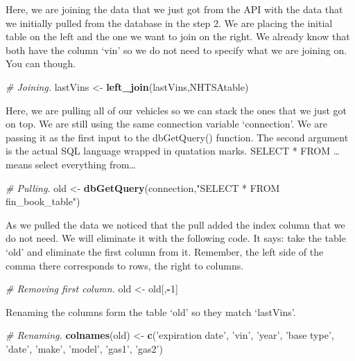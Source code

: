 \documentclass[]{book}
\newenvironment{Shaded}{\begin{snugshade}}{\end{snugshade}}
\newcommand{\CommentTok}[1]{\textcolor[rgb]{0.56,0.35,0.01}{\textit{#1}}}
\newcommand{\DecValTok}[1]{\textcolor[rgb]{0.00,0.00,0.81}{#1}}
\newcommand{\KeywordTok}[1]{\textcolor[rgb]{0.13,0.29,0.53}{\textbf{#1}}}
\newcommand{\NormalTok}[1]{#1}
\newcommand{\OperatorTok}[1]{\textcolor[rgb]{0.81,0.36,0.00}{\textbf{#1}}}
\newcommand{\StringTok}[1]{\textcolor[rgb]{0.31,0.60,0.02}{#1}}
\begin{document}
Here, we are joining the data that we just got from the API with the data that we initially pulled from the database in the step 2. We are placing the initial table on the left and the one we want to join on the right. We already know that both have the column `vin' so we do not need to specify what we are joining on. You can though.

\begin{Shaded}
\begin{Highlighting}[]
\CommentTok{# Joining.}
\NormalTok{lastVins <-}\StringTok{ }\KeywordTok{left_join}\NormalTok{(lastVins,NHTSAtable)}
\end{Highlighting}
\end{Shaded}

Here, we are pulling all of our vehicles so we can stack the ones that we just got on top. We are still using the same connection variable `connection'. We are passing it as the first input to the dbGetQuery() function. The second argument is the actual SQL language wrapped in quatation marks. SELECT * FROM \ldots{} means select everything from\ldots{}

\begin{Shaded}
\begin{Highlighting}[]
\CommentTok{# Pulling.}
\NormalTok{old <-}\StringTok{ }\KeywordTok{dbGetQuery}\NormalTok{(connection,}\StringTok{"SELECT * FROM fin_book_table"}\NormalTok{)}
\end{Highlighting}
\end{Shaded}

As we pulled the data we noticed that the pull added the index column that we do not need. We will eliminate it with the following code. It says: take the table `old' and eliminate the first column from it. Remember, the left side of the comma there corresponds to rows, the right to columns.

\begin{Shaded}
\begin{Highlighting}[]
\CommentTok{# Removing first column.}
\NormalTok{old <-}\StringTok{ }\NormalTok{old[,}\OperatorTok{-}\DecValTok{1}\NormalTok{]}
\end{Highlighting}
\end{Shaded}

Renaming the columns form the table `old' so they match `lastVins'.

\begin{Shaded}
\begin{Highlighting}[]
\CommentTok{# Renaming.}
\KeywordTok{colnames}\NormalTok{(old) <-}\StringTok{ }\KeywordTok{c}\NormalTok{(}\StringTok{'expiration date'}\NormalTok{,}
                   \StringTok{'vin'}\NormalTok{,}
                   \StringTok{'year'}\NormalTok{,}
                   \StringTok{'base type'}\NormalTok{,}
                   \StringTok{'date'}\NormalTok{,}
                   \StringTok{'make'}\NormalTok{,}
                   \StringTok{'model'}\NormalTok{,}
                   \StringTok{'gas1'}\NormalTok{,}
                   \StringTok{'gas2'}\NormalTok{)}
\end{Highlighting}
\end{Shaded}
\end{document}
